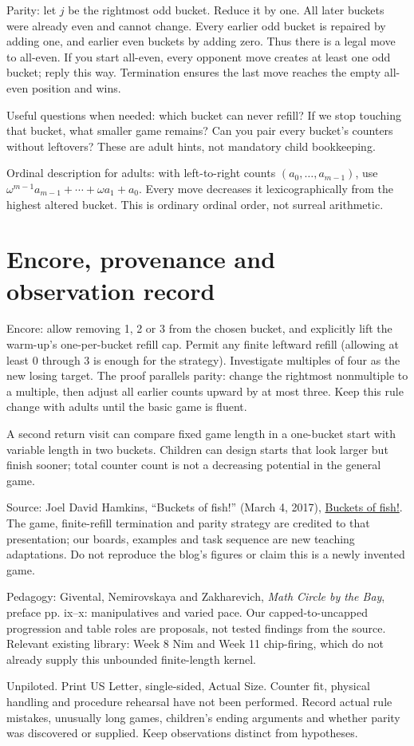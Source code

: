 \documentclass[11pt,letterpaper]{article}
\begin{document}
Parity: let $j$ be the rightmost odd bucket. Reduce it by one. All later buckets were already even and cannot change. Every earlier odd bucket is repaired by adding one, and earlier even buckets by adding zero. Thus there is a legal move to all-even. If you start all-even, every opponent move creates at least one odd bucket; reply this way. Termination ensures the last move reaches the empty all-even position and wins.

Useful questions when needed: which bucket can never refill? If we stop touching that bucket, what smaller game remains? Can you pair every bucket's counters without leftovers? These are adult hints, not mandatory child bookkeeping.

Ordinal description for adults: with left-to-right counts $(a_0,\ldots,a_{m-1})$, use $\omega^{m-1}a_{m-1}+\cdots+\omega a_1+a_0$. Every move decreases it lexicographically from the highest altered bucket. This is ordinary ordinal order, not surreal arithmetic.
\newpage
\section*{Encore, provenance and observation record}
Encore: allow removing 1, 2 or 3 from the chosen bucket, and explicitly lift the warm-up's one-per-bucket refill cap. Permit any finite leftward refill (allowing at least 0 through 3 is enough for the strategy). Investigate multiples of four as the new losing target. The proof parallels parity: change the rightmost nonmultiple to a multiple, then adjust all earlier counts upward by at most three. Keep this rule change with adults until the basic game is fluent.

A second return visit can compare fixed game length in a one-bucket start with variable length in two buckets. Children can design starts that look larger but finish sooner; total counter count is not a decreasing potential in the general game.

Source: Joel David Hamkins, ``Buckets of fish!'' (March 4, 2017), \href{https://jdh.hamkins.org/buckets-of-fish/}{Buckets of fish!}. The game, finite-refill termination and parity strategy are credited to that presentation; our boards, examples and task sequence are new teaching adaptations. Do not reproduce the blog's figures or claim this is a newly invented game.

Pedagogy: Givental, Nemirovskaya and Zakharevich, \emph{Math Circle by the Bay}, preface pp. ix--x: manipulatives and varied pace. Our capped-to-uncapped progression and table roles are proposals, not tested findings from the source. Relevant existing library: Week 8 Nim and Week 11 chip-firing, which do not already supply this unbounded finite-length kernel.

Unpiloted. Print US Letter, single-sided, Actual Size. Counter fit, physical handling and procedure rehearsal have not been performed. Record actual rule mistakes, unusually long games, children's ending arguments and whether parity was discovered or supplied. Keep observations distinct from hypotheses.
\end{document}
